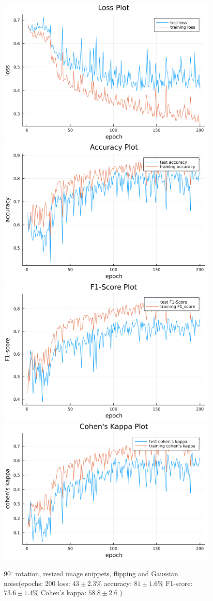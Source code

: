 \documentclass[
a4paper, 
12pt,
grayscalebody, %
abstract=on,
twoside, BCOR10mm, 12pt, DIV13,headinclude, footexclude, final, abstracton, openright
]{ibireprt}
\numberwithin{equation}{chapter}
\numberwithin{table}{chapter}
\numberwithin{figure}{chapter}
\numberwithin{algorithm}{chapter}
\numberwithin{example}{chapter}
\numberwithin{example}{chapter}
\begin{document}
\begin{figure}
	\includegraphics[width=0.4\linewidth]{loss_png_final_run_6_2.png}\hfill
\includegraphics[width=0.4\linewidth]{accuracy_png_final_run_6_2.png}
\\[\smallskipamount]
\includegraphics[width=0.4\linewidth]{f1_score_png_final_run_6_2.png}\hfill
\includegraphics[width=0.4\linewidth]{cohens_kappa_png_final_run_6_2.png}
	\caption{90$^{\circ}$ rotation, resized image snippets, flipping and Gaussian noise(epochs: 200 loss: $43\pm2.3\% $ accuracy: $81\pm1.6\%$ F1-score: $73.6\pm1.4\%$  Cohen's kappa: $58.8\pm2.6$ )}
\end{figure}%
\end{document}
